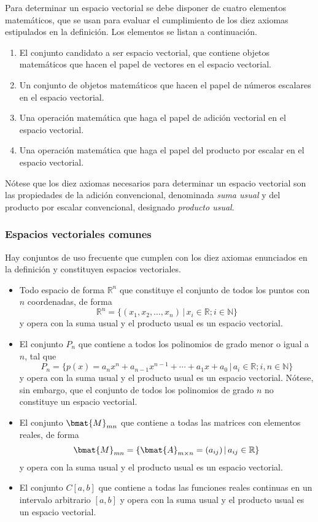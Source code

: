 \documentclass{fmbnotes}
\begin{document}
Para determinar un espacio vectorial se debe disponer de cuatro elementos matemáticos, que se usan para evaluar el cumplimiento de los diez axiomas estipulados en la definición. Los elementos se listan a continuación. 
\begin{enumerate}
\item El conjunto candidato a ser espacio vectorial, que contiene objetos matemáticos que hacen el papel de vectores en el espacio vectorial.
\item Un conjunto de objetos matemáticos que hacen el papel de números escalares en el espacio vectorial.
\item Una operación matemática que haga el papel de adición vectorial en el espacio vectorial.
\item Una operación matemática que haga el papel del producto por escalar en el espacio vectorial.
\end{enumerate}

Nótese que los diez axiomas necesarios para determinar un espacio vectorial son las propiedades de la adición  convencional, denominada \emph{suma usual} y del producto por escalar convencional, designado \emph{producto usual}. 

\subsubsection{Espacios vectoriales comunes}

Hay conjuntos de uso frecuente que cumplen con los diez axiomas enunciados en la definición y constituyen espacios vectoriales.

\begin{itemize}
\item Todo espacio de forma \(\mathbb{R}^{n}\) que constituye el conjunto de todos los puntos con \(n\) coordenadas, de forma  \[\mathbb{R}^{n}=\{(x_1,x_2,\ldots,x_n)\, |\,x_i \in \mathbb{R}; i \in \mathbb{N}\}\] y opera con la suma usual y el producto usual es un espacio vectorial.
\item El conjunto \(P_n\) que contiene a todos los polinomios de grado menor o igual a \(n\), tal que
\[P_n= \{p(x)=a_n x^n + a_{n-1} x^{n-1} + \cdots + a_1 x + a_0 \, | \, a_i \in \mathbb{R}; i,n \in \mathbb{N}\}\] 
y opera con la suma usual y el producto usual es un espacio vectorial. Nótese, sin embargo, que el conjunto de todos los polinomios de grado \(n\) no constituye un espacio vectorial.
\item El conjunto \(\bmat{M}_{mn}\) que contiene a todas las matrices con elementos reales, de forma \[\bmat{M}_{mn}=\{\bmat{A}_{m \times n}=(a_{ij})\,|\,a_{ij}\in \mathbb{R}\}\] y opera con la suma usual y el producto usual es un espacio vectorial.
\item El conjunto \(C[a,b]\) que contiene a todas las funciones reales continuas en un intervalo arbitrario \([a,b]\) y opera con la suma usual y el producto usual es un espacio vectorial.
\end{itemize}
\end{document}
